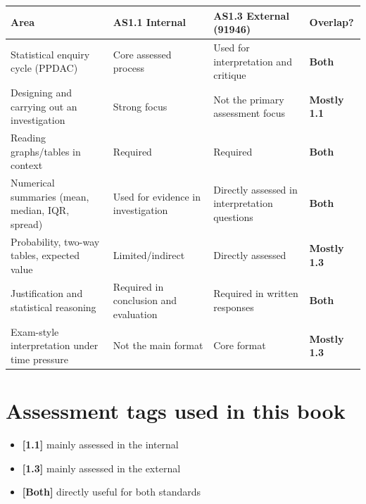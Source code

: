 \documentclass[
  11pt,
  a4paper,
  oneside,
  open=any]{scrbook}
\providecommand{\tightlist}{%
  \setlength{\itemsep}{0pt}\setlength{\parskip}{0pt}}
\begin{document}
\begin{longtable}[]{@{}
  >{\raggedright\arraybackslash}p{}
  >{\raggedright\arraybackslash}p{}
  >{\raggedright\arraybackslash}p{}
  >{\raggedright\arraybackslash}p{}@{}}
\toprule\noalign{}
\begin{minipage}[b]{\linewidth}\raggedright
Area
\end{minipage} & \begin{minipage}[b]{\linewidth}\raggedright
AS1.1 Internal
\end{minipage} & \begin{minipage}[b]{\linewidth}\raggedright
AS1.3 External (91946)
\end{minipage} & \begin{minipage}[b]{\linewidth}\raggedright
Overlap?
\end{minipage} \\
\midrule\noalign{}
\endhead
\bottomrule\noalign{}
\endlastfoot
Statistical enquiry cycle (PPDAC) & Core assessed process & Used for
interpretation and critique & \textbf{Both} \\
Designing and carrying out an investigation & Strong focus & Not the
primary assessment focus & \textbf{Mostly 1.1} \\
Reading graphs/tables in context & Required & Required &
\textbf{Both} \\
Numerical summaries (mean, median, IQR, spread) & Used for evidence in
investigation & Directly assessed in interpretation questions &
\textbf{Both} \\
Probability, two-way tables, expected value & Limited/indirect &
Directly assessed & \textbf{Mostly 1.3} \\
Justification and statistical reasoning & Required in conclusion and
evaluation & Required in written responses & \textbf{Both} \\
Exam-style interpretation under time pressure & Not the main format &
Core format & \textbf{Mostly 1.3} \\
\end{longtable}

\section{Assessment tags used in this
book}\label{assessment-tags-used-in-this-book}

\begin{itemize}
\tightlist
\item
  \textbf{{[}1.1{]}} mainly assessed in the internal
\item
  \textbf{{[}1.3{]}} mainly assessed in the external
\item
  \textbf{{[}Both{]}} directly useful for both standards
\end{itemize}
\end{document}
